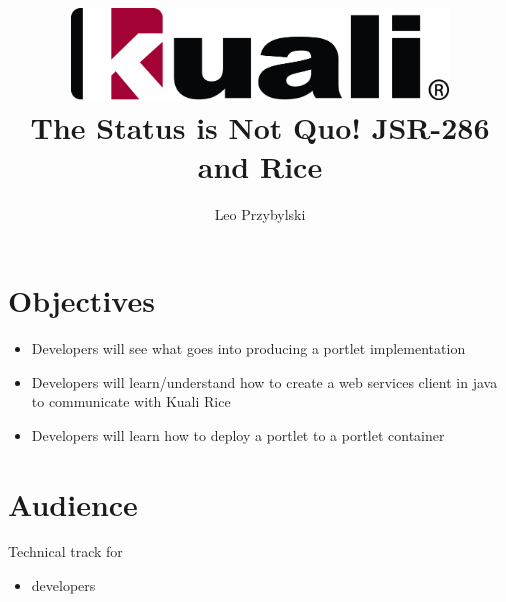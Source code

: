 \documentclass[12pt,notitlepage]{article}
\author{Leo Przybylski}
\title{\includegraphics[width=0.75\textwidth]{kuali_base.png}\\The Status is Not Quo! JSR-286 and Rice}
\date{}
\begin{document}
\maketitle
{}
\section{Objectives}
\begin{itemize}
\item Developers will see what goes into producing a portlet implementation
\item Developers will learn/understand how to create a web services client in java to communicate with Kuali Rice
\item Developers will learn how to deploy a portlet to a portlet
  container
\end{itemize}

\section{Audience}
Technical track for
\begin{itemize}
\item developers
\end{itemize}
\end{document}
